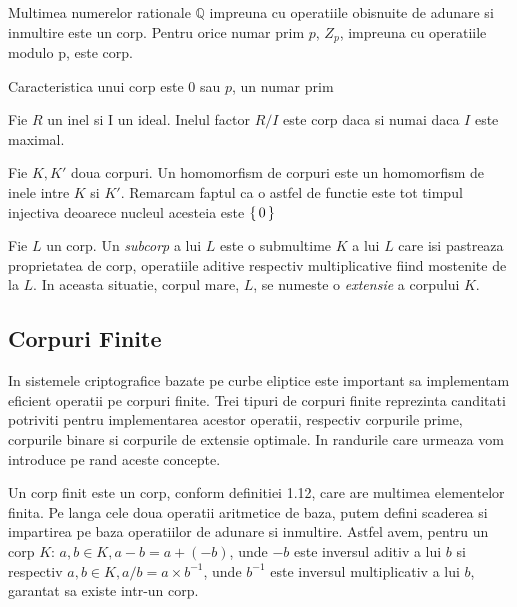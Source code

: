 \begin{ex}
Multimea numerelor rationale $\mathbb{Q}$ impreuna cu operatiile obisnuite de adunare si inmultire este un corp. Pentru orice numar prim $p$, $Z_p$, impreuna cu operatiile modulo p, este corp.  
\end{ex}

\begin{prop}
Caracteristica unui corp este $0$ sau $p$, un numar prim
\end{prop}

\begin{prop}
Fie $R$ un inel si I un ideal. Inelul factor $R/I$ este corp daca si numai daca $I$ este maximal.
\end{prop}

\begin{dfn}
Fie $K, K'$ doua corpuri. Un homomorfism de corpuri este un homomorfism de inele intre $K$ si $K'$. Remarcam faptul ca o astfel de functie este tot timpul injectiva deoarece nucleul acesteia este $\set {0}$ 
\end{dfn}

\begin{dfn}
Fie $L$ un corp. Un \textit{subcorp} a lui $L$ este o submultime $K$ a lui $L$ care isi pastreaza proprietatea de corp, operatiile aditive respectiv multiplicative fiind mostenite de la $L$. In aceasta situatie, corpul mare, $L$, se numeste o \textit{extensie} a corpului $K$.
\end{dfn}
\subsection{Corpuri Finite}
\label{subsec:subsec01}

In sistemele criptografice bazate pe curbe eliptice este important sa implementam eficient operatii pe corpuri finite. Trei tipuri de corpuri finite reprezinta canditati potriviti pentru implementarea acestor operatii, respectiv corpurile prime, corpurile binare si corpurile de extensie optimale. In randurile care urmeaza vom introduce pe rand aceste concepte.

\begin{dfn}
Un corp finit este un corp, conform definitiei 1.12, care are multimea elementelor finita. Pe langa cele doua operatii aritmetice de baza, putem defini scaderea si impartirea pe baza operatiilor de adunare si inmultire. Astfel avem, pentru un corp $K$: $a, b\in K, a-b = a + (-b)$, unde $-b$ este inversul aditiv a lui $b$ si respectiv $a, b\in K, a/b = a \times b^{-1}$, unde $b^{-1}$ este inversul multiplicativ a lui $b$, garantat sa existe intr-un corp. 
\end{dfn}

